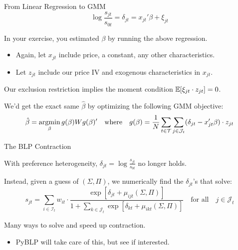 \documentclass[aspectratio=169,t,11pt,table]{beamer}
\begin{document}
\begin{frame}{From Linear Regression to GMM}
    \vspace{-\baselineskip}
    \begin{equation*}
        \log\frac{s_{jt}}{s_{0t}} = \delta_{jt} = x_{jt}'\beta + \xi_{jt}
    \end{equation*}
    \vspace{-0.5\baselineskip}
    \begin{wideitemize}
        \item In your exercise, you estimated $\beta$ by running the above regression.
        \begin{itemize}
            \item Again, let $x_{jt}$ include price, a constant, any other characteristics.
            \item Let $z_{jt}$ include our price IV and exogenous characteristics in $x_{jt}$.
        \end{itemize}
        \pause
        \item Our exclusion restriction implies the moment condition $\mathbb{E}[\xi_{jt} \cdot z_{jt}] = 0$.
        \pause
        \item We'd get the exact same $\hat{\beta}$ by optimizing the following GMM objective:
        \begin{equation*}
            \hat{\beta} = \operatorname*{argmin}_\beta g(\beta) W g(\beta)' \quad\text{where}\quad g(\beta) = \frac{1}{N} \sum_{t \in \mathcal{T}} \sum_{j \in \mathcal{J}_t} (\delta_{jt} - x_{jt}'\beta) \cdot z_{jt}
        \end{equation*}
    \end{wideitemize}
\end{frame}

\begin{frame}{The BLP Contraction}
    \begin{wideitemize}
        \item With preference heterogeneity, $\delta_{jt} = \log\frac{s_{jt}}{s_{0t}}$ no longer holds.
        \pause
        \item Instead, given a guess of $(\Sigma, \Pi)$, we numerically find the $\delta_{jt}$'s that solve:
        \begin{equation*}
            s_{jt} = \sum_{i \in \mathcal{I}_t} w_{it} \cdot \frac{\exp[\delta_{jt} + \mu_{ijt}(\Sigma, \Pi)]}{1 + \sum_{k \in \mathcal{J}_t} \exp[\delta_{kt} + \mu_{ikt}(\Sigma, \Pi)]} \quad\text{for all}\quad j \in \mathcal{J}_t
        \end{equation*}
        \vspace{-1em}
        \pause
        \item Many ways to solve and speed up contraction.
        \begin{itemize}
            \item PyBLP will take care of this, but see \cite{conlon2020best} if interested.
        \end{itemize}
    \end{wideitemize}
\end{frame}
\end{document}
